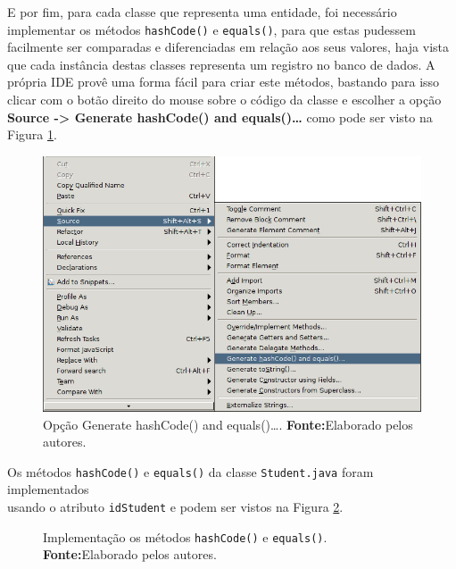 	\pagebreak

	\par E por fim, para cada classe que representa uma entidade, foi necessário
implementar os métodos \texttt{hashCode()} e \texttt{equals()}, para que estas
pudessem facilmente ser comparadas e diferenciadas em relação aos seus valores,
haja vista que cada instância destas classes representa um registro no banco de
dados. A própria IDE provê uma forma fácil para criar este métodos, bastando
para isso clicar com o botão direito do mouse sobre o código da classe e
escolher a opção \textbf{Source -> Generate hashCode() and equals()\ldots} como
pode ser visto na Figura \ref{fig:desws13}.

	\begin{figure}[h!]
		\centerline{\includegraphics[scale=0.8]{./imagens/2_q_metodologico/4_procedimentos_resultados/43_webservice/432_desenvolvimento/desws13.png}}
		\caption[Opção Generate hashCode() and equals()\ldots]{Opção Generate
		hashCode() and equals()\ldots .
			\textbf{Fonte:}Elaborado pelos autores.}
		\label{fig:desws13}
	\end{figure}
	
	\par Os métodos \texttt{hashCode()} e \texttt{equals()} da classe
\texttt{Student.java} foram implementados\\ usando o atributo \texttt{idStudent}
e podem ser vistos na Figura \ref{fig:desws15}.

	\begin{figure}[h!]
		
		\caption[Implementação os métodos hashCode() e equals()]{Implementação os
		métodos \texttt{hashCode()} e \texttt{equals()}.
			\textbf{Fonte:}Elaborado pelos autores.}
		\label{fig:desws15}
	\end{figure}
	
